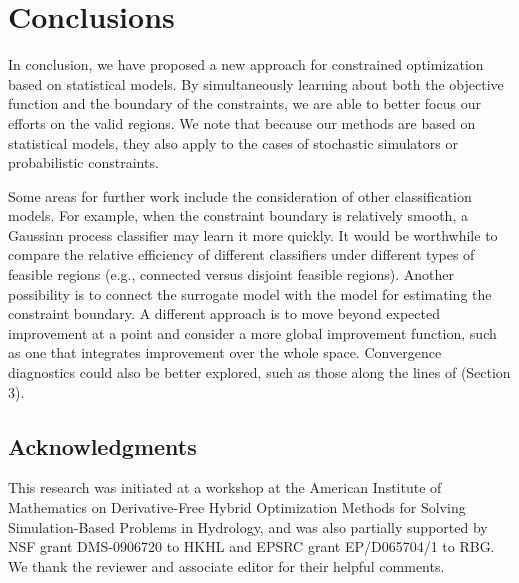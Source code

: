 \documentclass[12pt]{article}
\begin{document}
\section{Conclusions} \label{sec:concl}

In conclusion, we have proposed a new approach for constrained
optimization based on statistical models.  By simultaneously learning
about both the objective function and the boundary of the constraints,
we are able to better focus our efforts on the valid regions.  We note
that because our methods are based on statistical models, they also
apply to the cases of stochastic simulators or probabilistic constraints.

Some areas for further work include the consideration of other
classification models.  For example, when the constraint boundary is
relatively smooth, a Gaussian process classifier \cite{brod:gram:2011} 
may learn it more quickly.  It would be worthwhile to compare the
relative efficiency of different classifiers under different types of
feasible regions (e.g., connected versus disjoint feasible regions).
Another possibility is to connect the surrogate model with the model
for estimating the constraint boundary.  A different approach is to
move beyond expected improvement at a point and consider a more global
improvement function, such as one that integrates improvement over the
whole space.  Convergence diagnostics could also be better explored,
such as those along the lines of \cite{gramacy:taddy:2010} (Section 3).

\subsection*{Acknowledgments}

This research was initiated at a workshop at the American Institute of
Mathematics on Derivative-Free Hybrid Optimization Methods for Solving
Simulation-Based Problems in Hydrology, and was also partially
supported by NSF grant DMS-0906720 to HKHL and EPSRC grant
EP/D065704/1 to RBG.  We thank the reviewer and associate editor for
their helpful comments.



\end{document}
